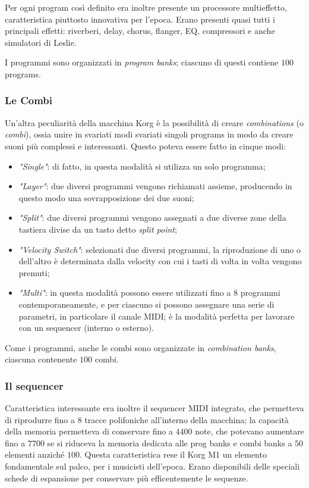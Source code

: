 \documentclass[12pt]{article}
\begin{document}
Per ogni program così definito era inoltre presente un processore multieffetto, caratteristica piuttosto innovativa per l'epoca. Erano presenti quasi tutti i principali effetti: riverberi, delay, chorus, flanger, EQ, compressori e anche simulatori di Leslie.

I programmi sono organizzati in \emph{program banks}; ciascuno di questi contiene \(100\) programs.

\subsubsection{Le Combi}
Un'altra peculiarità della macchina Korg è la possibilità di creare \emph{combinations} (o \emph{combi}), ossia unire in svariati modi svariati singoli programs in modo da creare suoni più complessi e interessanti. Questo poteva essere fatto in cinque modi:

\begin{itemize}
 \item \emph{"Single"}: di fatto, in questa modalità si utilizza un solo programma;
 \item \emph{"Layer"}: due diversi programmi vengono richiamati assieme, producendo in questo modo una sovrapposizione dei due suoni;
 \item \emph{"Split"}: due diversi programmi vengono assegnati a due diverse zone della tastiera divise da un tasto detto \emph{split point};
 \item \emph{"Velocity Switch"}: selezionati due diversi programmi, la riproduzione di uno o dell'altro è determinata dalla velocity con cui i tasti di volta in volta vengono premuti;
 \item \emph{"Multi"}: in questa modalità possono essere utilizzati fino a \(8\) programmi contemporaneamente, e per ciascuno si possono assegnare una serie di parametri, in particolare il canale MIDI; è la modalità perfetta per lavorare con un sequencer (interno o esterno).
\end{itemize}

Come i programmi, anche le combi sono organizzate in \emph{combination banks}, ciascuna contenente \(100\) combi.

\subsubsection{Il sequencer}
Caratteristica interessante era inoltre il sequencer MIDI integrato, che permetteva di riprodurre fino a \(8\) tracce polifoniche all'interno della macchina; la capacità della memoria permetteva di conservare fino a \(4400\) note, che potevano aumentare fino a \(7700\) se si riduceva la memoria dedicata alle prog banks e combi banks a \(50\) elementi anziché \(100\). Questa caratteristica rese il Korg M1 un elemento fondamentale sul palco, per i musicisti dell'epoca. Erano disponibili delle speciali schede di espansione per conservare più efficentemente le sequenze.
\end{document}
